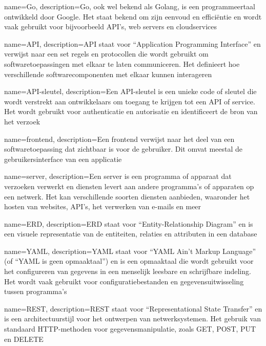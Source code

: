 {
    name=Go,
    description={Go, ook wel bekend als Golang, is een programmeertaal ontwikkeld door Google. Het staat bekend om zijn eenvoud en efficiëntie en wordt vaak gebruikt voor bijvoorbeeld API's, web servers en cloudservices}
}

{
    name=API,
    description={API staat voor ``Application Programming Interface'' en verwijst naar een set regels en protocollen die wordt gebruikt om softwaretoepassingen met elkaar te laten communiceren. Het definieert hoe verschillende softwarecomponenten met elkaar kunnen interageren}
}

{
    name=API-sleutel,
    description={Een API-sleutel is een unieke code of sleutel die wordt verstrekt aan ontwikkelaars om toegang te krijgen tot een API of service. Het wordt gebruikt voor authenticatie en autorisatie en identificeert de bron van het verzoek}
}

{
    name=frontend,
    description={Een frontend verwijst naar het deel van een softwaretoepassing dat zichtbaar is voor de gebruiker. Dit omvat meestal de gebruikersinterface van een applicatie}
}

{
    name=server,
    description={Een server is een programma of apparaat dat verzoeken verwerkt en diensten levert aan andere programma's of apparaten op een netwerk. Het kan verschillende soorten diensten aanbieden, waaronder het hosten van websites, API's, het verwerken van e-mails en meer}
}

{
    name=ERD,
    description={ERD staat voor ``Entity-Relationship Diagram'' en is een visuele representatie van de entiteiten, relaties en attributen in een database}
}

{
    name=YAML,
    description={YAML staat voor ``YAML Ain't Markup Language'' (of ``YAML is geen opmaaktaal'') en is een opmaaktaal die wordt gebruikt voor het configureren van gegevens in een menselijk leesbare en schrijfbare indeling. Het wordt vaak gebruikt voor configuratiebestanden en gegevensuitwisseling tussen programma's}
}

{
    name=REST,
    description={REST staat voor ``Representational State Transfer'' en is een architectuurstijl voor het ontwerpen van netwerksystemen. Het gebruik van standaard HTTP-methoden voor gegevensmanipulatie, zoals GET, POST, PUT en DELETE}
}

